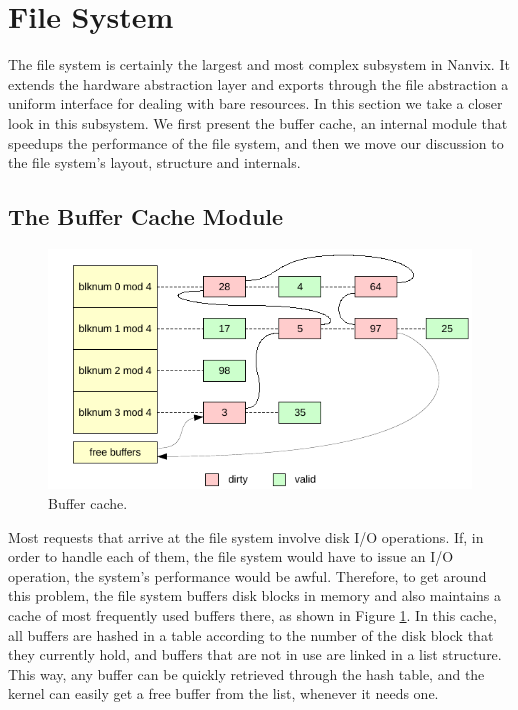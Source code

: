 \documentclass[10pt,a4paper]{article}
\begin{document}
\section{File System}
\label{section: file system}

The file system is certainly the largest and most complex subsystem in Nanvix. It extends the hardware abstraction layer and exports through the file abstraction a uniform interface for dealing with bare resources. In this section we take a closer look in this subsystem. We first present the buffer cache, an internal module that speedups the performance of the file system, and then we move our discussion to the file system's layout, structure and internals.

\subsection{The Buffer Cache Module}
\label{subsection: the buffer cache module}

\begin{figure}[t]
	\centering
	\includegraphics[scale=1]{img/buffer-cache}
	\caption{Buffer cache.}
	\label{figure: buffer cache}
\end{figure}

Most requests that arrive at the file system involve disk I/O operations. If, in order to handle each of them, the file system would have to issue an I/O operation, the system's performance would be awful. Therefore, to get around this problem, the file system buffers disk blocks in memory and also maintains a cache of most frequently used buffers there, as shown in Figure \ref{figure: buffer cache}. In this cache, all buffers are hashed in a table according to the number of the disk block that they currently hold, and buffers that are not in use are linked in a list structure. This way, any buffer can be quickly retrieved through the hash table, and the kernel can easily get a free buffer from the list, whenever it needs one.
\end{document}
